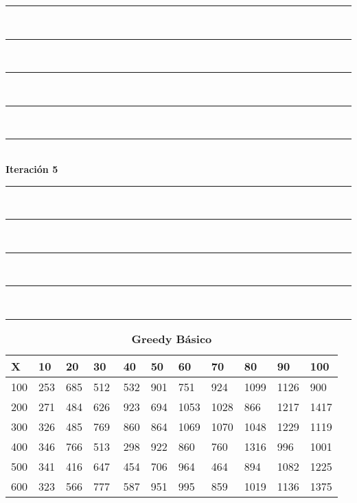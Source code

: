 \documentclass[10pt,letterpaper]{article}
\begin{document}
\newpage 
\begin{center}
\newcommand{\HRule}{\rule{\linewidth}{0.5mm}}
\center
\HRule\\[6cm]
\HRule\\[0.4cm]
\HRule\\[0.4cm]
\HRule\\[0.4cm]
\HRule\\[0.4cm]
{\centering \Huge\bfseries Iteración 5}\\[0.4cm]
\HRule\\[0.4cm]
\HRule\\[0.4cm]
\HRule\\[0.4cm]
\HRule\\[6cm]
\HRule
\end{center}
\newpage 
{}
\begin{center}
\begin{table}\renewcommand{\arraystretch}{2.5}
\caption{\large \textbf{Greedy Básico}}
\centering
\begin{tabular} { |m{0.5cm}|m{1.3cm}|m{1.3cm}|m{1.3cm}|m{1.3cm}|m{1.3cm}|m{1.3cm}|m{1.3cm}|m{1.3cm}|m{1.3cm}|m{1.3cm}|} 
\hline
\rowcolor{Gray}
\centering \textbf{X} & \centering \textbf{10} & \centering \textbf{20} & \centering \textbf{30}\ & \centering \textbf{40} & \centering \textbf{50} & \centering \textbf{60}\ & \centering \textbf{70} & \centering \textbf{80} & \centering \textbf{90}\ & \textbf{100} \\\hline
\cellcolor{Gray}100 & \Large 253 & \Large 685 & \Large 512 & \Large 532 & \Large 901 & \Large 751 & \Large 924 & \Large 1099 & \Large 1126 & \Large 900 \\
\hline
\cellcolor{Gray}200 & \Large 271 & \Large 484 & \Large 626 & \Large 923 & \Large 694 & \Large 1053 & \Large 1028 & \Large 866 & \Large 1217 & \Large 1417 \\
\hline
\cellcolor{Gray}300 & \Large 326 & \Large 485 & \Large 769 & \Large 860 & \Large 864 & \Large 1069 & \Large 1070 & \Large 1048 & \Large 1229 & \Large 1119 \\
\hline
\cellcolor{Gray}400 & \Large 346 & \Large 766 & \Large 513 & \Large 298 & \Large 922 & \Large 860 & \Large 760 & \Large 1316 & \Large 996 & \Large 1001 \\
\hline
\cellcolor{Gray}500 & \Large 341 & \Large 416 & \Large 647 & \Large 454 & \Large 706 & \Large 964 & \Large 464 & \Large 894 & \Large 1082 & \Large 1225 \\
\hline
\cellcolor{Gray}600 & \Large 323 & \Large 566 & \Large 777 & \Large 587 & \Large 951 & \Large 995 & \Large 859 & \Large 1019 & \Large 1136 & \Large 1375 \\

\end{tabular}
\end{table}
\end{center}
\end{document}
